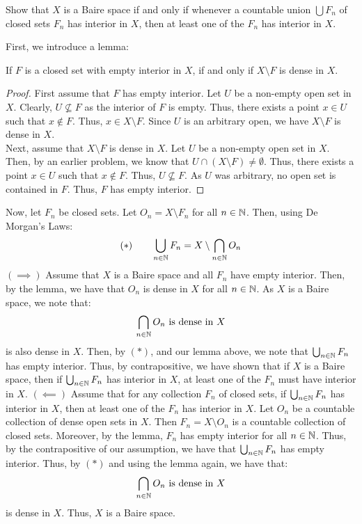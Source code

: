 \documentclass[12pt]{article}
\begin{document}
\begin{problab}{9}
    Show that $X$ is a Baire space if and only if whenever a countable union $\bigcup F_n$ of closed sets $F_n$ has interior in $X$, then at least one of the $F_n$ has interior in $X$.
\end{problab}
\begin{solu}
    First, we introduce a lemma: 
    \begin{lemma}
        If $F$ is a closed set with empty interior in $X$, if and only if $X \setminus F$ is dense in $X$.         
    \end{lemma}
    \begin{proof}
        First assume that $F$ has empty interior. Let $U$ be a non-empty open set in $X$. Clearly, $U \not \subseteq F$ as the interior of $F$ is empty. Thus, there exists a point $x \in U$ such that $x \not \in F$. Thus, $x \in X \setminus F$. Since $U$ is an arbitrary open, we have $X \setminus F$ is dense in $X$. \\
        Next, assume that $X \setminus F$ is dense in $X$. Let $U$ be a non-empty open set in $X$. Then, by an earlier problem, we know that $U \cap (X \setminus F) \neq \emptyset$. Thus, there exists a point $x \in U$ such that $x \not \in F$. Thus, $U \not \subseteq F$. As $U$ was arbitrary, no open set is contained in $F$. Thus, $F$ has empty interior.         
    \end{proof}
    \bbni
    Now, let $F_n$ be closed sets. Let $O_n = X \setminus F_n$ for all $n \in \mathbb N$. Then, using De Morgan's Laws:
    \[(*) \qquad \bigcup_{n \in \mathbb N} F_n = X \setminus \bigcap_{n \in \mathbb N} O_n \]
    $(\implies)$ Assume that $X$ is a Baire space and all $F_n$ have empty interior. Then, by the lemma, we have that $O_n$ is dense in $X$ for all $n \in \mathbb N$. As $X$ is a Baire space, we note that:
    \[ \bigcap_{n \in \mathbb N} O_n \text{ is dense in $X$} \]
    is also dense in $X$. Then, by $(*)$, and our lemma above, we note that $\bigcup_{n \in \mathbb N} F_n$ has empty interior. Thus, by contrapositive, we have shown that if $X$ is a Baire space, then if $\bigcup_{n \in \mathbb N} F_n$ has interior in $X$, at least one of the $F_n$ must have interior in $X$. \bbni
    $(\impliedby)$ Assume that for any collection $F_n$ of closed sets, if $\bigcup_{n \in \mathbb N} F_n$ has interior in $X$, then at least one of the $F_n$ has interior in $X$. Let $O_n$ be a countable collection of dense open sets in $X$. Then $F_n = X \setminus O_n$ is a countable collection of closed sets. Moreover, by the lemma, $F_n$ has empty interior for all $n \in \mathbb N$. Thus, by the contrapositive of our assumption, we have that $\bigcup_{n \in \mathbb N} F_n$ has empty interior. Thus, by $(*)$ and using the lemma again, we have that:
    \[ \bigcap_{n \in \mathbb N} O_n \text{ is dense in $X$} \]
    is dense in $X$. Thus, $X$ is a Baire space.
\end{solu}
\newpage 
\end{document}
